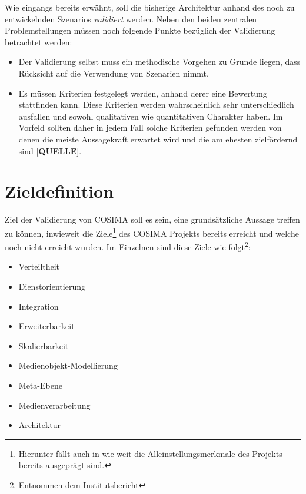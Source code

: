  Wie eingangs bereits erwähnt, soll die bisherige Architektur anhand des noch zu entwickelnden Szenarios \emph{validiert} werden. Neben den beiden zentralen Problemstellungen müssen noch folgende Punkte bezüglich der Validierung betrachtet werden:

  \begin{itemize}
    \item Der Validierung selbst muss ein methodische Vorgehen zu Grunde liegen, dass Rücksicht auf die Verwendung von Szenarien nimmt.
    \item Es müssen Kriterien festgelegt werden, anhand derer eine Bewertung stattfinden kann. Diese Kriterien werden wahrscheinlich sehr unterschiedlich ausfallen und sowohl qualitativen wie quantitativen Charakter haben. Im Vorfeld sollten daher in jedem Fall solche Kriterien gefunden werden von denen die meiste Aussagekraft erwartet wird und die am ehesten zielfördernd sind [\textbf{QUELLE}].
  \end{itemize}


\section{Zieldefinition} %
\label{sec:zieldefinition}

  Ziel der Validierung von COSIMA soll es sein, eine grundsätzliche Aussage treffen zu können, inwieweit die Ziele\footnote{Hierunter fällt auch in wie weit die Alleinstellungsmerkmale des Projekts bereits ausgeprägt sind.} des COSIMA Projekts bereits erreicht und welche noch nicht erreicht wurden. Im Einzelnen sind diese Ziele wie folgt\footnote{Entnommen dem Institutsbericht}:
  
  \begin{itemize}
    \item Verteiltheit
    \item Dienstorientierung
    \item Integration
    \item Erweiterbarkeit
    \item Skalierbarkeit
    \item Medienobjekt-Modellierung
    \item Meta-Ebene
    \item Medienverarbeitung
    \item Architektur
  \end{itemize}
  
